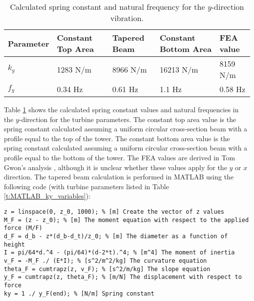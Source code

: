 \begin{table}[]
\caption{Calculated spring constant and natural frequency for the $y$-direction vibration.} \label{t:ky_values}
\begin{center}
\begin{tabular}{|m{1in}|m{1in}|m{1in}|m{1in}|m{1in}|}
\rowcolor[HTML]{EFEFEF} 
\hline
\textbf{Parameter} & \textbf{Constant Top Area} & \textbf{Tapered Beam} & \textbf{Constant Bottom Area} & \textbf{FEA value} \\ \hline
$k_y$ & 1283 N/m & 8966 N/m & 16213 N/m & 8159 N/m \\  \hline
$f_y$ & 0.34 Hz & 0.61 Hz & 1.1 Hz & 0.58 Hz\\ \hline
\end{tabular}
\end{center}
\end{table}

Table \ref{t:ky_values} shows the calculated spring constant values and natural frequencies in the $y$-direction for the turbine parameters.  The constant top area value is the spring constant calculated assuming a uniform circular cross-section beam with a profile equal to the top of the tower.  The constant bottom area value is the spring constant calculated assuming a uniform circular cross-section beam with a profile equal to the bottom of the tower.  The FEA values are derived in Tom Gwon's analysis \cite{Gwon_paper}, although it is unclear whether these values apply for the $y$ or $x$ direction.  The tapered beam calculation is performed in MATLAB using the following code (with turbine parameters listed in Table \ref{t:MATLAB_ky_variables}):

\begin{lstlisting}
z = linspace(0, z_0, 1000); % [m] Create the vector of z values
M_F = (z - z_0); % [m] The moment equation with respect to the applied force (M/F)
d_F = d_b - z*(d_b-d_t)/z_0; % [m] The diameter as a function of height
I = pi/64*d.^4 - (pi/64)*(d-2*t).^4; % [m^4] The moment of inertia
v_F = -M_F ./ (E*I); % [s^2/m^2/kg] The curvature equation
theta_F = cumtrapz(z, v_F); % [s^2/m/kg] The slope equation
y_F = cumtrapz(z, theta_F); % [m/N] The displacement with respect to force
ky = 1 ./ y_F(end); % [N/m] Spring constant
\end{lstlisting}
\FloatBarrier


